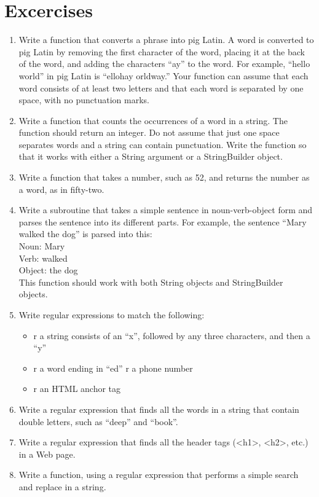 \documentclass[12pt,a4paper,final,twoside,titlepage]{book}
\begin{document}
\section{Excercises}
\begin{enumerate}
\item Write a function that converts a phrase into pig Latin. A word is converted to pig Latin by removing the first character of the word, placing it at the back of the word, and adding the characters “ay” to the word. For example, “hello world” in pig Latin is “ellohay orldway.” Your function can assume that each word consists of at least two letters and that each word is separated by one space, with no punctuation marks.
\item Write a function that counts the occurrences of a word in a string. The function should return an integer. Do not assume that just one space separates words and a string can contain punctuation. Write the function so that it works with either a String argument or a StringBuilder object.
\item Write a function that takes a number, such as 52, and returns the number as a word, as in fifty-two.
\item Write a subroutine that takes a simple sentence in noun-verb-object form and parses the sentence into its different parts. For example, the sentence “Mary walked the dog” is parsed into this:\\
Noun: Mary \\
Verb: walked \\
Object: the dog\\
This function should work with both String objects and StringBuilder objects.
\item Write regular expressions to match the following:
\begin{itemize}
\item r a string consists of an “x”, followed by any three characters, and then a “y”
\item r a word ending in “ed” r a phone number
\item r an HTML anchor tag
\end{itemize}
\item Write a regular expression that finds all the words in a string that contain double letters, such as “deep” and “book”.
\item  Write a regular expression that finds all the header tags (<h1>, <h2>, etc.) in a Web page.
\item  Write a function, using a regular expression that performs a simple search and replace in a string.
\end{enumerate}
\end{document}
